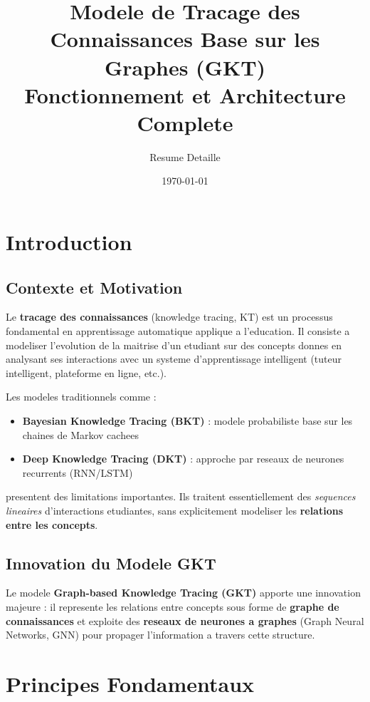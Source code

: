 \documentclass[11pt, a4paper]{article}
\title{\textbf{Modele de Tracage des Connaissances Base sur les Graphes (GKT)} \\ \large Fonctionnement et Architecture Complete}
\author{Resume Detaille}
\date{\today}
\begin{document}
\maketitle

\tableofcontents
\newpage

\section{Introduction}

\subsection{Contexte et Motivation}

Le \textbf{tracage des connaissances} (knowledge tracing, KT) est un processus fondamental en apprentissage automatique applique a l'education. Il consiste a modeliser l'evolution de la maitrise d'un etudiant sur des concepts donnes en analysant ses interactions avec un systeme d'apprentissage intelligent (tuteur intelligent, plateforme en ligne, etc.).

Les modeles traditionnels comme :
\begin{itemize}
    \item \textbf{Bayesian Knowledge Tracing (BKT)} : modele probabiliste base sur les chaines de Markov cachees
    \item \textbf{Deep Knowledge Tracing (DKT)} : approche par reseaux de neurones recurrents (RNN/LSTM)
\end{itemize}

presentent des limitations importantes. Ils traitent essentiellement des \emph{sequences lineaires} d'interactions etudiantes, sans explicitement modeliser les \textbf{relations entre les concepts}.

\subsection{Innovation du Modele GKT}

Le modele \textbf{Graph-based Knowledge Tracing (GKT)} apporte une innovation majeure : il represente les relations entre concepts sous forme de \textbf{graphe de connaissances} et exploite des \textbf{reseaux de neurones a graphes} (Graph Neural Networks, GNN) pour propager l'information a travers cette structure.

\section{Principes Fondamentaux}
\end{document}

